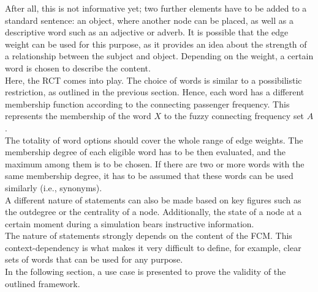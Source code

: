\documentclass[conference]{IEEEtran}
\begin{document}
After all, this is not informative yet; two further elements have to be added to a standard sentence: an object, where another node can be placed, as well as a descriptive word such as an adjective or adverb. It is possible that the edge weight can be used for this purpose, as it provides an idea about the strength of a relationship between the subject and object. Depending on the weight, a certain word is chosen to describe the content.\\
Here, the RCT comes into play. The choice of words is similar to a possibilistic restriction, as outlined in the previous section. Hence, each word has a different membership function according to the connecting passenger frequency. This represents the membership of the word $X$ to the fuzzy connecting frequency set $A$.\\
The totality of word options should cover the whole range of edge weights. The membership degree of each eligible word has to be then evaluated, and the maximum among them is to be chosen. If there are two or more words with the same membership degree, it has to be assumed that these words can be used similarly (i.e., synonyms).\\
A different nature of statements can also be made based on key figures such as the outdegree or the centrality of a node. Additionally, the state of a node at a certain moment during a simulation bears instructive information.\\
The nature of statements strongly depends on the content of the FCM. This context-dependency is what makes it very difficult to define, for example, clear sets of words that can be used for any purpose.\\
In the following section, a use case is presented to prove the validity of the outlined framework.
\end{document}
